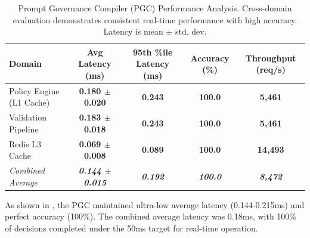 \documentclass[manuscript,screen,9pt]{acmart}
\newcommand{\tablesize}{\footnotesize}
\newcommand{\tablenumfmt}[1]{\textbf{#1}}
\newcommand{\tableheader}[1]{\textbf{#1}}
\begin{document}
\begin{table}[htbp]
\centering
\caption{Prompt Governance Compiler (PGC) Performance Analysis. Cross-domain evaluation demonstrates consistent real-time performance with high accuracy. Latency is mean $\pm$ std. dev.}
\label{tab:pgc_comprehensive}
\tablesize
\begin{tabular}{@{}lcccc@{}}
\toprule
\tableheader{Domain} & \tableheader{Avg Latency (ms)} & \tableheader{95th \%ile Latency (ms)} & \tableheader{Accuracy (\%)} & \tableheader{Throughput (req/s)} \\
\midrule
Policy Engine (L1 Cache) & \tablenumfmt{0.180 $\pm$ 0.020}   & \tablenumfmt{0.243}  & \tablenumfmt{100.0} & \tablenumfmt{5,461} \\
Validation Pipeline  & \tablenumfmt{0.183 $\pm$ 0.018}  & \tablenumfmt{0.243}  & \tablenumfmt{100.0} & \tablenumfmt{5,461} \\
Redis L3 Cache & \tablenumfmt{0.069 $\pm$ 0.008}  & \tablenumfmt{0.089}  & \tablenumfmt{100.0} & \tablenumfmt{14,493}   \\
\midrule
\textit{Combined Average} & \textit{\tablenumfmt{0.144 $\pm$ 0.015}} & \textit{\tablenumfmt{0.192}} & \textit{\tablenumfmt{100.0}} & \textit{\tablenumfmt{8,472}} \\
\bottomrule
\end{tabular}
\end{table}

As shown in , the PGC maintained ultra-low average latency (0.144-0.215ms) and perfect accuracy (100\%). The combined average latency was 0.18ms, with 100\% of decisions completed under the 50ms target for real-time operation.
\end{document}

